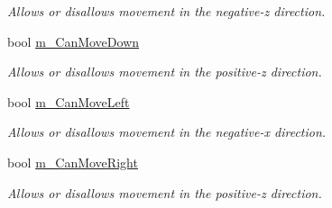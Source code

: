 \begin{DoxyCompactItemize}
\begin{DoxyCompactList}\small\item\em Allows or disallows movement in the negative-\/z direction. \end{DoxyCompactList}\item 
\hypertarget{classBomberman_a5223d50b2493eaf043823163967263d1}{bool \hyperlink{classBomberman_a5223d50b2493eaf043823163967263d1}{m\-\_\-\-Can\-Move\-Down}}\label{classBomberman_a5223d50b2493eaf043823163967263d1}

\begin{DoxyCompactList}\small\item\em Allows or disallows movement in the positive-\/z direction. \end{DoxyCompactList}\item 
\hypertarget{classBomberman_a30f83269a09e452c1c106b1126bf4044}{bool \hyperlink{classBomberman_a30f83269a09e452c1c106b1126bf4044}{m\-\_\-\-Can\-Move\-Left}}\label{classBomberman_a30f83269a09e452c1c106b1126bf4044}

\begin{DoxyCompactList}\small\item\em Allows or disallows movement in the negative-\/x direction. \end{DoxyCompactList}\item 
\hypertarget{classBomberman_aabe090a5003c927d4a266a8f33d38542}{bool \hyperlink{classBomberman_aabe090a5003c927d4a266a8f33d38542}{m\-\_\-\-Can\-Move\-Right}}\label{classBomberman_aabe090a5003c927d4a266a8f33d38542}

\begin{DoxyCompactList}\small\item\em Allows or disallows movement in the positive-\/z direction. \end{DoxyCompactList}\end{DoxyCompactItemize}
